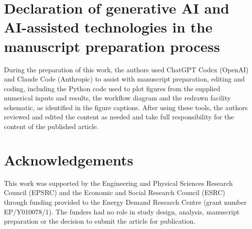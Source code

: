 \documentclass[lettersize,journal]{IEEEtran}
\providecommand{\DIFadd}[1]{{\color{blue}#1}}
\providecommand{\DIFaddbegin}{}
\providecommand{\DIFaddend}{}
\begin{document}
\section*{\DIFadd{Declaration of generative AI and AI-assisted technologies in the manuscript preparation process}}
\DIFadd{During the preparation of this work, the authors used ChatGPT Codex (OpenAI) and Claude Code (Anthropic) to assist with manuscript preparation, editing and coding, including the Python code used to plot figures from the supplied numerical inputs and results, the workflow diagram and the redrawn facility schematic, as identified in the figure captions. After using these tools, the authors reviewed and edited the content as needed and take full responsibility for the content of the published article.

}

\section*{\DIFadd{Acknowledgements}}
\DIFaddend This work was supported by the Engineering and Physical Sciences Research Council (EPSRC) and the Economic and Social Research Council (ESRC) through funding provided to the Energy Demand Research Centre (grant number EP/Y010078/1).  \DIFaddbegin \DIFadd{The funders had no role in study design, analysis, manuscript preparation or the decision to submit the article for publication}\DIFaddend .

 \DIFaddbegin 

 \DIFaddend
\end{document}
